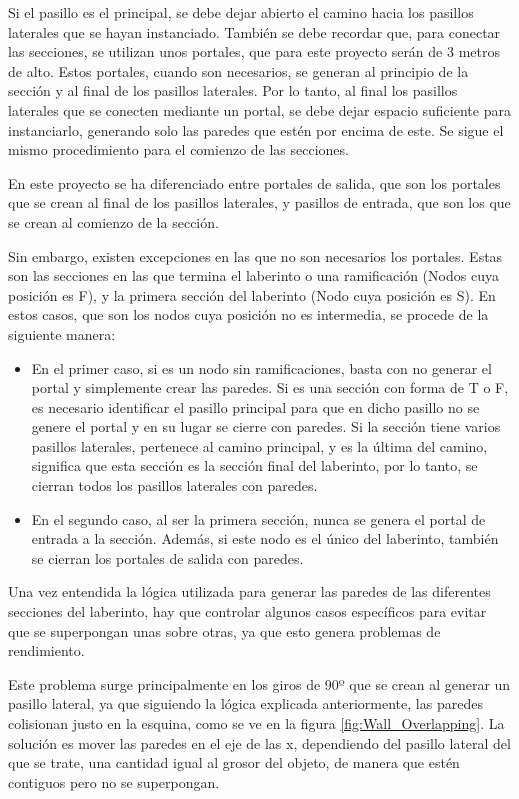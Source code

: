 \documentclass[../main.tex]{subfiles}
\begin{document}
Si el pasillo es el principal, se debe dejar abierto el camino hacia los pasillos laterales que se hayan instanciado. También se debe recordar que, para conectar las secciones, se utilizan unos portales, que para este proyecto serán de 3 metros de alto. Estos portales, cuando son necesarios, se generan al principio de la sección y al final de los pasillos laterales. Por lo tanto, al final los pasillos laterales que se conecten mediante un portal, se debe dejar espacio suficiente para instanciarlo, generando solo las paredes que estén por encima de este. Se sigue el mismo procedimiento para el comienzo de las secciones.

En este proyecto se ha diferenciado entre portales de salida, que son los portales que se crean al final de los pasillos laterales, y pasillos de entrada, que son los que se crean al comienzo de la sección.

Sin embargo, existen excepciones en las que no son necesarios los portales. Estas son las secciones en las que termina el laberinto o una ramificación (Nodos cuya posición es F), y la primera sección del laberinto (Nodo cuya posición es S). En estos casos, que son los nodos cuya posición no es intermedia, se procede de la siguiente manera:

\begin{itemize}
    \item En el primer caso, si es un nodo sin ramificaciones, basta con no generar el portal y simplemente crear las paredes. Si es una sección con forma de T o F, es necesario identificar el pasillo principal para que en dicho pasillo no se genere el portal y en su lugar se cierre con paredes. Si la sección tiene varios pasillos laterales, pertenece al camino principal, y es la última del camino, significa que esta sección es la sección final del laberinto, por lo tanto, se cierran todos los pasillos laterales con paredes.
    \item En el segundo caso, al ser la primera sección, nunca se genera el portal de entrada a la sección. Además, si este nodo es el único del laberinto, también se cierran los portales de salida con paredes.
\end{itemize}


Una vez entendida la lógica utilizada para generar las paredes de las diferentes secciones del laberinto, hay que controlar algunos casos específicos para evitar que se superpongan unas sobre otras, ya que esto genera problemas de rendimiento.

Este problema surge principalmente en los giros de 90º que se crean al generar un pasillo lateral, ya que siguiendo la lógica explicada anteriormente, las paredes colisionan justo en la esquina, como se ve en la figura \ref{fig:Wall_Overlapping}. La solución es mover las paredes en el eje de las x, dependiendo del pasillo lateral del que se trate, una cantidad igual al grosor del objeto, de manera que estén contiguos pero no se superpongan.
\end{document}
